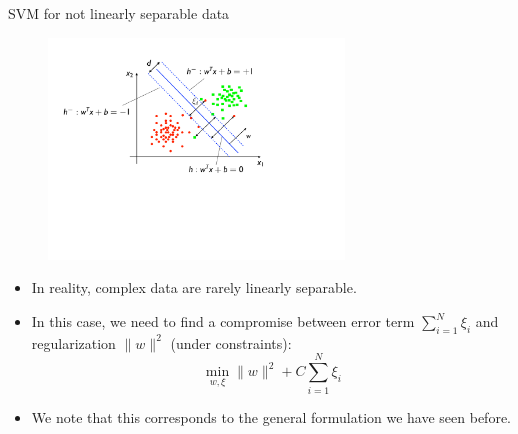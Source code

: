 \documentclass[xcolor=pdftex,dvipsnames,table]{beamer}
\begin{document}
\begin{frame}{SVM for not linearly separable data}
	\begin{figure}[htb]
		\includegraphics[width=0.7\textwidth]{../graphics/SVM3.pdf}
	\end{figure}
	\begin{itemize}
		\item In reality, complex data are rarely linearly separable.
		\item In this case, we need to find a compromise between error term $\sum_{i=1}^{N}\xi_i$ and regularization $\|w\|^2$ (under constraints):
		\begin{equation*}
			\min_{w,\xi} \|w\|^2 + C \sum_{i=1}^{N}\xi_i
		\end{equation*}
		\item We note that this corresponds to the general formulation we have seen before.
	\end{itemize}
\end{frame}
\end{document}
